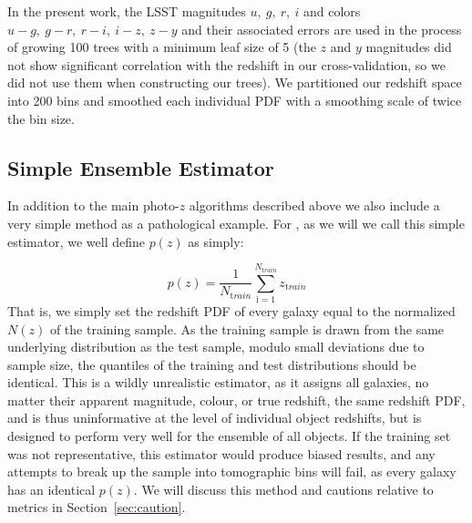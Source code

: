 In the present work, the LSST magnitudes $u,~g,~r,~i$ and colors $u-g,~g-r,~r-i,~i-z,~z-y$ and their associated errors are used in the process of growing 100 trees with a minimum leaf size of 5 (the $z$ and $y$ magnitudes did not show significant correlation with the redshift in our cross-validation, so we did not use them when constructing our trees). We partitioned our redshift space into 200 bins and smoothed each individual PDF with a smoothing scale of twice the bin size.

\subsection{Simple Ensemble Estimator}\label{sec:method:trainz}
In addition to the main photo-$z$ algorithms described above we also include a very simple method as a pathological example.  For \trainz, as we will we call this simple estimator, we well define $p(z)$ as simply:

\begin{equation}
p(z) = \frac{1}{N_{ \mathrm train}}\sum_{\mathrm i=1}^{N_{\mathrm train}}z_{\mathrm train}
\end{equation}
That is, we simply set the redshift PDF of every galaxy equal to the normalized $N(z)$ of the training sample.  As the training sample is drawn from the same underlying distribution as the test sample, modulo small deviations due to sample size, the quantiles of the training and test distributions should be identical.  This is a wildly unrealistic estimator, as it assigns all galaxies, no matter their apparent magnitude, colour, or true redshift, the same redshift PDF, and is thus uninformative at the level of individual object redshifts, but is designed to perform very well for the ensemble of all objects.  If the training set was not representative, this estimator would produce biased results, and any attempts to break up the sample into tomographic bins will fail, as every galaxy has an identical $p(z)$.  We will discuss this method and cautions relative to metrics in Section~\ref{sec:caution}.
